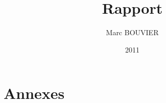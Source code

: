 \documentclass[12pt,oneside]{book}
\title{Rapport}
\author{Marc BOUVIER}
\date{2011}
\newcommand{\clearemptydoublepage}{%
	\newpage{\pagestyle{empty}\cleardoublepage}}
\begin{document}
	 
	\begin{frontmatter}
		\clearemptydoublepage
		\chapter*{}
		
		
		\tableofcontents{} %
		\listoffigures{}  %
	\end{frontmatter}
	\begin{mainmatter}
		
	\end{mainmatter}
	\part*{Annexes}
	\begin{appendix}
	
	
	
	\end{appendix}
	\clearemptydoublepage
	\begin{backmatter}
	
	\end{backmatter}
\end{document}
